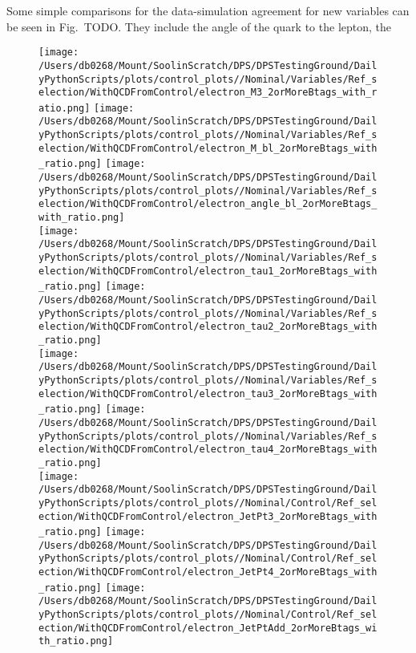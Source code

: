 Some simple comparisons for the data-simulation agreement for new variables can be seen in Fig.~TODO.
They include the angle of the \bquark{} quark to the lepton, the 
\begin{figure}[htpb]
	\centering
	\texttt{[image: /Users/db0268/Mount/SoolinScratch/DPS/DPSTestingGround/DailyPythonScripts/plots/control\_plots//Nominal/Variables/Ref\_selection/WithQCDFromControl/electron\_M3\_2orMoreBtags\_with\_ratio.png]}
	\texttt{[image: /Users/db0268/Mount/SoolinScratch/DPS/DPSTestingGround/DailyPythonScripts/plots/control\_plots//Nominal/Variables/Ref\_selection/WithQCDFromControl/electron\_M\_bl\_2orMoreBtags\_with\_ratio.png]}
	\texttt{[image: /Users/db0268/Mount/SoolinScratch/DPS/DPSTestingGround/DailyPythonScripts/plots/control\_plots//Nominal/Variables/Ref\_selection/WithQCDFromControl/electron\_angle\_bl\_2orMoreBtags\_with\_ratio.png]} \\
	\vspace{0.4cm}
	\texttt{[image: /Users/db0268/Mount/SoolinScratch/DPS/DPSTestingGround/DailyPythonScripts/plots/control\_plots//Nominal/Variables/Ref\_selection/WithQCDFromControl/electron\_tau1\_2orMoreBtags\_with\_ratio.png]}
	\texttt{[image: /Users/db0268/Mount/SoolinScratch/DPS/DPSTestingGround/DailyPythonScripts/plots/control\_plots//Nominal/Variables/Ref\_selection/WithQCDFromControl/electron\_tau2\_2orMoreBtags\_with\_ratio.png]} \\
	\vspace{0.4cm}
	\texttt{[image: /Users/db0268/Mount/SoolinScratch/DPS/DPSTestingGround/DailyPythonScripts/plots/control\_plots//Nominal/Variables/Ref\_selection/WithQCDFromControl/electron\_tau3\_2orMoreBtags\_with\_ratio.png]}
	\texttt{[image: /Users/db0268/Mount/SoolinScratch/DPS/DPSTestingGround/DailyPythonScripts/plots/control\_plots//Nominal/Variables/Ref\_selection/WithQCDFromControl/electron\_tau4\_2orMoreBtags\_with\_ratio.png]} \\
	\texttt{[image: /Users/db0268/Mount/SoolinScratch/DPS/DPSTestingGround/DailyPythonScripts/plots/control\_plots//Nominal/Control/Ref\_selection/WithQCDFromControl/electron\_JetPt3\_2orMoreBtags\_with\_ratio.png]}
	\texttt{[image: /Users/db0268/Mount/SoolinScratch/DPS/DPSTestingGround/DailyPythonScripts/plots/control\_plots//Nominal/Control/Ref\_selection/WithQCDFromControl/electron\_JetPt4\_2orMoreBtags\_with\_ratio.png]} 
	\texttt{[image: /Users/db0268/Mount/SoolinScratch/DPS/DPSTestingGround/DailyPythonScripts/plots/control\_plots//Nominal/Control/Ref\_selection/WithQCDFromControl/electron\_JetPtAdd\_2orMoreBtags\_with\_ratio.png]}\\
	\caption[]{}
	\label{fig:LPT_LETA}
\end{figure}

